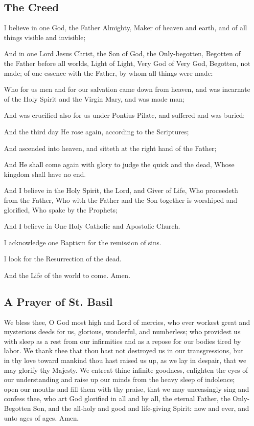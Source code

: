 \subsection{The Creed}

I believe in one God, the Father Almighty, Maker of heaven and earth, and of all things visible and invisible;

And in one Lord Jesus Christ, the Son of God, the Only-begotten, Begotten of the Father before all worlds, Light of Light, Very God of Very God, Begotten, not made; of one essence with the Father, by whom all things were made:

Who for us men and for our salvation came down from heaven, and was incarnate of the Holy Spirit and the Virgin Mary, and was made man;

And was crucified also for us under Pontius Pilate, and suffered and was buried;

And the third day He rose again, according to the Scriptures;

And ascended into heaven, and sitteth at the right hand of the Father;

And He shall come again with glory to judge the quick and the dead, Whose kingdom shall have no end.

And I believe in the Holy Spirit, the Lord, and Giver of Life, Who proceedeth from the Father, Who with the Father and the Son together is worshiped and glorified, Who spake by the Prophets;

And I believe in One Holy Catholic and Apostolic Church.

I acknowledge one Baptism for the remission of sins.

I look for the Resurrection of the dead.

And the Life of the world to come. Amen.

\subsection{A Prayer of St. Basil}

We bless thee, O God most high and Lord of mercies, who ever workest great and mysterious deeds for us, glorious, wonderful, and numberless; who providest us with sleep as a rest from our infirmities and as a repose for our bodies tired by labor. We thank thee that thou hast not destroyed us in our transgressions, but in thy love toward mankind thou hast raised us up, as we lay in despair, that we may glorify thy Majesty. We entreat thine infinite goodness, enlighten the eyes of our understanding and raise up our minds from the heavy sleep of indolence; open our mouths and fill them with thy praise, that we may unceasingly sing and confess thee, who art God glorified in all and by all, the eternal Father, the Only-Begotten Son, and the all-holy and good and life-giving Spirit: now and ever, and unto ages of ages. Amen.

